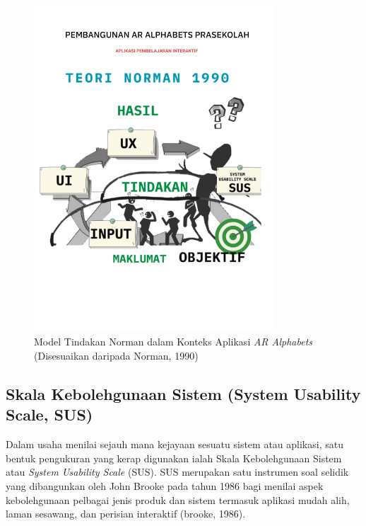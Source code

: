 \begin{figure}[H]
\centering\includegraphics[width=0.8\textwidth]{------norman teori.png}\caption{Model Tindakan Norman dalam Konteks Aplikasi \textit{AR Alphabets} (Disesuaikan daripada Norman, 1990)}\label{rajah:norman}\end{figure}

\subsection{Skala Kebolehgunaan Sistem (System Usability Scale, SUS)}

Dalam usaha menilai sejauh mana kejayaan sesuatu sistem atau aplikasi, satu bentuk pengukuran yang kerap digunakan ialah Skala Kebolehgunaan Sistem atau \textit{System Usability Scale} (SUS). SUS merupakan satu instrumen soal selidik yang dibangunkan oleh John Brooke pada tahun 1986 bagi menilai aspek kebolehgunaan pelbagai jenis produk dan sistem termasuk aplikasi mudah alih, laman sesawang, dan perisian interaktif (brooke, 1986).

